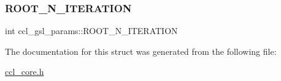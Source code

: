 \subsubsection{\texorpdfstring{R\+O\+O\+T\+\_\+\+N\+\_\+\+I\+T\+E\+R\+A\+T\+I\+ON}{ROOT\_N\_ITERATION}}
{\footnotesize\ttfamily int ccl\+\_\+gsl\+\_\+params\+::\+R\+O\+O\+T\+\_\+\+N\+\_\+\+I\+T\+E\+R\+A\+T\+I\+ON}



The documentation for this struct was generated from the following file\+:\begin{DoxyCompactItemize}
\item 
\mbox{\hyperlink{ccl__core_8h}{ccl\+\_\+core.\+h}}\end{DoxyCompactItemize}
